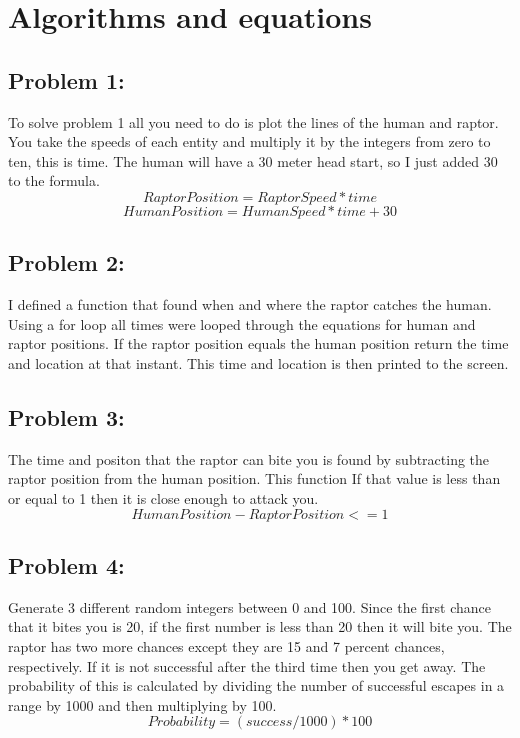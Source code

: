 \documentclass[twocolumn]{revtex4}
\begin{document}
\section{Algorithms and equations} 

\subsection{Problem 1:}
To solve problem 1 all you need to do is plot the lines of the human and raptor. You take the speeds of each entity and multiply it by the integers from zero to ten, this is time. The human will have a 30 meter head start, so I just added 30 to the formula.
	$$ RaptorPosition = RaptorSpeed * time $$
	$$ HumanPosition = HumanSpeed * time +30$$
	
\subsection{Problem 2:} I defined a function that found when and where the raptor catches the human. Using a for loop all times were looped through the equations for human and raptor positions. If the raptor position equals the human position return the time and location at that instant. This time and location is then printed to the screen.

\subsection{Problem 3:} The time and positon that the raptor can bite you is found by subtracting the raptor position from the human position. This function If that value is less than or equal to 1 then it is close enough to attack you.
$$ HumanPosition - RaptorPosition <= 1$$

\subsection{Problem 4:} Generate 3 different random integers between 0 and 100. Since the first chance that it bites you is 20, if the first number is less than 20 then it will bite you. The raptor has two more chances except they are 15 and 7 percent chances, respectively. If it is not successful after the third time then you get away. The probability of this is calculated by dividing the number of successful escapes in a range by 1000 and then multiplying by 100.
$$Probability = (success/1000) * 100$$
\end{document}
